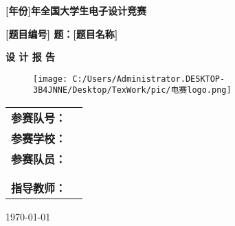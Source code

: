 \documentclass{ctexart}
\begin{document}
\begin{titlepage}
    \centering
    \vspace*{2cm}
    
    {\Huge \bfseries [年份]年全国大学生电子设计竞赛} %
    
    \vspace{2.5cm}
    
    {\huge \bfseries [题目编号] 题：[题目名称]} %
    
    \vspace{1.5cm}
    
    {\Large \bfseries 设 计 报 告}
    
    \vspace{2cm}

    \begin{figure}[H]
        \centering
        \texttt{[image: C:/Users/Administrator.DESKTOP-3B4JNNE/Desktop/TexWork/pic/电赛logo.png]}
    \end{figure}

    \vspace{3cm}
    
    \begin{tabular}{ll}
        \bfseries 参赛队号： & \underline{\hspace{5cm}} \\
        \bfseries 参赛学校： & \underline{\hspace{5cm}} \\
        \bfseries 参赛队员： & \underline{\hspace{5cm}} \\
                             & \underline{\hspace{5cm}} \\
                             & \underline{\hspace{5cm}} \\
        \bfseries 指导教师： & \underline{\hspace{5cm}} \\
    \end{tabular}
    
    \vspace{1cm}
    
    {\large \today}
    
\end{titlepage}
\end{document}
